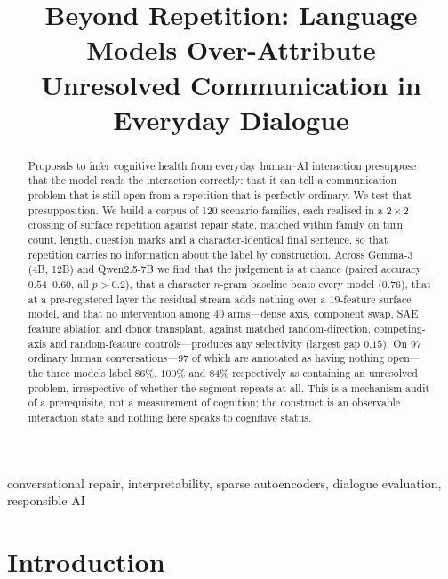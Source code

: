 \documentclass[conference]{IEEEtran}
\begin{document}
\title{Beyond Repetition: Language Models Over-Attribute\\Unresolved Communication in Everyday Dialogue}

\author{
}

\maketitle

\begin{abstract}
Proposals to infer cognitive health from everyday human--AI interaction presuppose that the model
reads the interaction correctly: that it can tell a communication problem that is still open from a
repetition that is perfectly ordinary. We test that presupposition. We build a corpus of 120
scenario families, each realised in a $2\times2$ crossing of surface repetition against repair
state, matched within family on turn count, length, question marks and a character-identical final
sentence, so that repetition carries no information about the label by construction. Across
Gemma-3 (4B, 12B) and Qwen2.5-7B we find that the judgement is at chance
(paired accuracy $0.54$--$0.60$, all $p>0.2$), that a character $n$-gram baseline beats every model
($0.76$), that at a pre-registered layer the residual stream adds nothing over a $19$-feature
surface model, and that no intervention among $40$ arms---dense axis, component swap, SAE feature
ablation and donor transplant, against matched random-direction, competing-axis and
random-feature controls---produces any selectivity (largest gap $0.15$). On $97$ ordinary human
conversations---97 of which are annotated as having nothing open---the three models label $86\%$,
$100\%$ and $84\%$ respectively as containing an unresolved problem,
irrespective of whether the segment repeats at all. This is a mechanism audit of a
prerequisite, not a measurement of cognition; the construct is an observable interaction state and
nothing here speaks to cognitive status.
\end{abstract}

\begin{IEEEkeywords}
conversational repair, interpretability, sparse autoencoders, dialogue evaluation, responsible AI
\end{IEEEkeywords}

\section{Introduction}
\label{sec:intro}
\end{document}
